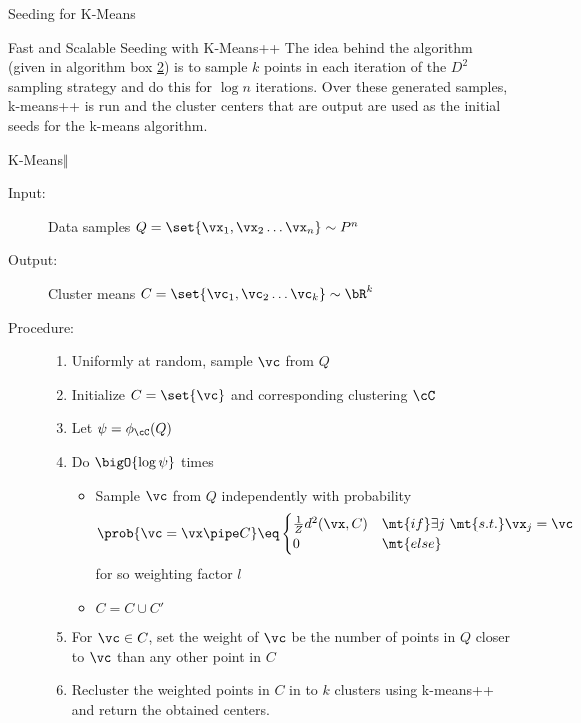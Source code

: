 \documentclass[10pt]{article}
\begin{document}
\begin{psection}{Seeding for K-Means}
\begin{psubsection}{Fast and Scalable Seeding with K-Means++}
        The idea behind the algorithm (given in algorithm box \hyperlink{algo:2}{2}) is
        to sample $k$ points in each iteration of the $D^2$ sampling strategy and do
        this for $\log n$ iterations. Over these generated samples, k-means++ is
        run and the cluster centers that are output are used as the initial seeds for
        the k-means algorithm.

        \begin{algo}[0.9\textwidth]{K-Means$\Vert$}
        
            \begin{description}
                \item[Input:] Data samples $Q = \set{\vx_1, \vx_2 \dots \vx_n} \sim P^n$
                \item[Output:] Cluster means
                    $C = \set{\vc_1, \vc_2 \dots \vc_k} \sim \bR^k$

                \item[Procedure:]
                    \begin{enumerate}
                        \item Uniformly at random, sample $\vc$ from $Q$
                        \item Initialize $C = \set{\vc}$ and corresponding clustering $\cC$
                        \item Let $\psi = \phi_\cC(Q)$
                        \item Do $\bigO{\log \psi}$ times
                            \begin{itemize}
                                \item Sample $\vc$ from $Q$ independently with
                                    probability
                                    \begin{align*}
                                        \prob{\vc = \vx \pipe C} \eq \begin{cases}
                                            \frac{1}{Z} d^2(\vx, C) & \mt{if} \exists j\ \mt{s.t.} \vx_j = \vc \\
                                            0 & \mt{else}
                                        \end{cases}
                                    \end{align*}
                                    for so weighting factor $l$
                                \item $C = C \cup C'$
                            \end{itemize}
                        \item For $\vc \in C$, set the weight of $\vc$ be the number of
                            points in $Q$ closer to $\vc$ than any other point in $C$
                        \item Recluster the weighted points in $C$ in to $k$ clusters
                            using k-means++ and return the obtained centers.
                    \end{enumerate}
            \end{description}
        

\end{algo}
\end{psubsection}
\end{psection}
\end{document}
